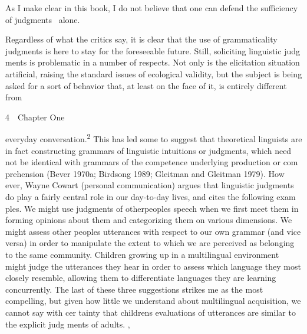 \begin{styleStandard}
  [Warning: Image ignored] %
 
\end{styleStandard}


\begin{styleStandard}
As I make clear in this book, I do not believe that one can defend the sufficiency of judgments \ alone.
\end{styleStandard}


\begin{styleStandard}
Regardless of what the critics say, it is clear that the use of grammaticality judgments is here to stay for the foreseeable future. Still, soliciting linguistic judg\- ments is problematic in a number of respects. Not only is the elicitation situation artificial, raising the standard issues of ecological validity, but the subject is being asked for a sort of behavior that, at least on the face of it, is entirely different from
\end{styleStandard}


\clearpage\setcounter{page}{1}\begin{styleStandard}
4\ \ Chapter One
\end{styleStandard}


\begin{styleTextbody}
everyday conversation.\textsuperscript{2}\textsuperscript{ }This has led some to suggest that theoretical linguists are in fact constructing grammars of linguistic intuitions or judgments, which need not be identical with grammars of the competence underlying production or com\- prehension (Bever 1970a; Birdsong 1989; Gleitman and Gleitman 1979). How\- ever, Wayne Cowart (personal communication) argues that linguistic judgments do play a fairly central role in our day-to-day lives, and cites the following exam\- ples. We might use judgments of otherpeople{\textquotesingle}s speech when we first meet them in forming opinions about them and categorizing them on various dimensions. We might assess other people{\textquotesingle}s utterances with respect to our own grammar (and vice versa) in order to manipulate the extent to which we are perceived as belonging to the same community. Children growing up in a multilingual environment might judge the utterances they hear in order to assess which language they most closely resemble, allowing them to differentiate languages they are learning concurrently. The last of these three suggestions strikes me as the most compelling, but given how little we understand about multilingual acquisition, we cannot say with cer\- tainty that children{\textquotesingle}s evaluations of utterances are similar to the explicit judg\- ments of adults. ,
\end{styleTextbody}


